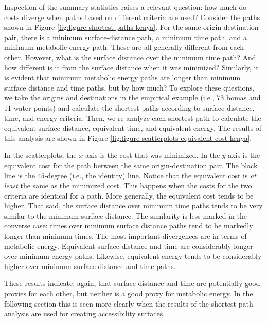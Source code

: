 \documentclass[]{elsarticle} %
\begin{document}
Inspection of the summary statistics raises a relevant question: how
much do costs diverge when paths based on different criteria are used?
Consider the paths shown in Figure
\ref{fig:figure-shortest-paths-kenya}. For the same origin-destination
pair, there is a minimum surface-distance path, a minimum time path, and
a minimum metabolic energy path. These are all generally different from
each other. However, what is the surface distance over the minimum time
path? And how different is it from the surface distance when it was
minimized? Similarly, it is evident that minimum metabolic energy paths
are longer than minimum surface distance and time paths, but by how
much? To explore these questions, we take the origins and destinations
in the empirical example (i.e., \(73\) bomas and \(11\) water points)
and calculate the shortest paths according to surface distance, time,
and energy criteria. Then, we re-analyze each shortest path to calculate
the equivalent surface distance, equivalent time, and equivalent energy.
The results of this analysis are shown in Figure
\ref{fig:figure-scatterplots-equivalent-cost-kenya}.

In the scatterplots, the \(x\)-axis is the cost that was minimized. In
the \(y\)-axis is the equivalent cost for the path between the same
origin-destination pair. The black line is the \(45\)-degree (i.e., the
identity) line. Notice that the equivalent cost is \emph{at least} the
same as the minimized cost. This happens when the costs for the two
criteria are identical for a path. More generally, the equivalent cost
tends to be higher. That said, the surface distance over minimum time
paths tends to be very similar to the minimum surface distance. The
similarity is less marked in the converse case: times over minimum
surface distance paths tend to be markedly longer than minimum times.
The most important divergences are in terms of metabolic energy.
Equivalent surface distance and time are considerably longer over
minimum energy paths. Likewise, equivalent energy tends to be
considerably higher over minimum surface distance and time paths.

These results indicate, again, that surface distance and time are
potentially good proxies for each other, but neither is a good proxy for
metabolic energy. In the following section this is seen more clearly
when the results of the shortest path analysis are used for creating
accessibility surfaces.
\end{document}
